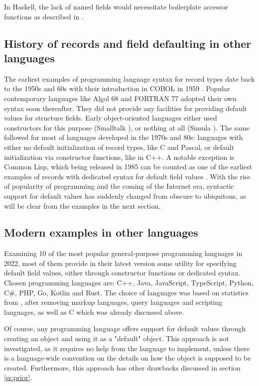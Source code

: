 \documentclass[en]{pracamgr}
\begin{document}
In Haskell, the lack of named fields would necessitate boilerplate accessor functions as described in \cite{WikibooksHaskellDatatypes}.

\subsection{History of records and field defaulting in other languages}
The earliest examples of programming language syntax for record types date back to the 1950s and 60s with their introduction in COBOL in 1959 \cite{sebesta1996concepts}.
Popular contemporary languages like Algol 68 \cite{van2012revised} and FORTRAN 77 \cite{fortran77} adopted their own syntax soon thereafter.
They did not provide any facilities for providing default values for structure fields.
Early object-oriented languages either used constructors for this purpose (Smalltalk \cite{smalltalk80}), or nothing at all (Simula \cite{Simula67}).
The same followed for most of languages developed in the 1970s and 80s: languages with either no default initialization of record types, like C and Pascal,
or default initialization via constructor functions, like in C++.
A notable exception is Common Lisp, which being released in 1985 can be counted 
as one of the earliest examples of records with dedicated syntax for default field values \cite{CommonLisp}.
With the rise of popularity of programming and the coming of the Internet era, 
syntactic support for default values has suddenly changed from obscure to ubiquitous, as will be clear from the examples in the next section.
\subsection{Modern examples in other languages}\label{subs:modernexamples}
Examining 10 of the most popular general-purpose programming languages in 2022,
most of them provide in their latest version some utility for specifying default field values,
either through constructor functions or dedicated syntax.
Chosen programming languages are: C++, Java, JavaScript, TypeScript, Python, C\#, PHP, Go, Kotlin and Rust.
The choice of languages was based on statistics from \cite{StatistaProgLangs}, after removing markup languages, 
query languages and scripting languages, as well as C which was already discussed above.

Of course, any programming language offers support for default values through creating an object and using it as a "default" object.
This approach is not investigated, as it requires no help from the language to implement, unless there is a language-wide
convention on the details on how the object is supposed to be created. Furthermore, this approach has other drawbacks discussed in section \ref{ss:prior}.
\end{document}
